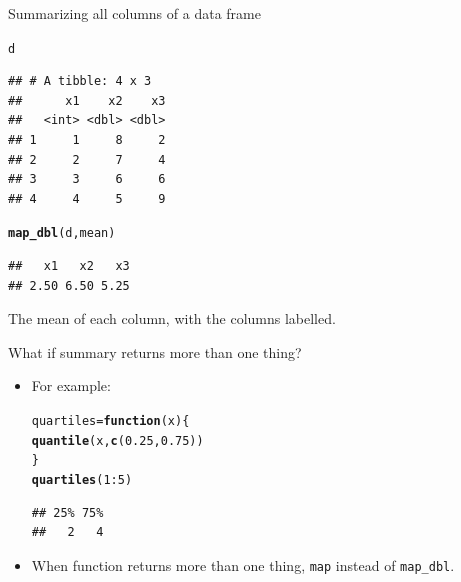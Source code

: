 \documentclass[unknownkeysallowed]{beamer}\usepackage[]{graphicx}\usepackage[]{color}
\makeatletter
\newcommand{\hlnum}[1]{\textcolor[rgb]{0.686,0.059,0.569}{#1}}%
\newcommand{\hlopt}[1]{\textcolor[rgb]{0,0,0}{#1}}%
\newcommand{\hlstd}[1]{\textcolor[rgb]{0.345,0.345,0.345}{#1}}%
\newcommand{\hlkwa}[1]{\textcolor[rgb]{0.161,0.373,0.58}{\textbf{#1}}}%
\newcommand{\hlkwb}[1]{\textcolor[rgb]{0.69,0.353,0.396}{#1}}%
\newcommand{\hlkwc}[1]{\textcolor[rgb]{0.333,0.667,0.333}{#1}}%
\newcommand{\hlkwd}[1]{\textcolor[rgb]{0.737,0.353,0.396}{\textbf{#1}}}%
\newenvironment{kframe}{%
 \def\at@end@of@kframe{}%
 \ifinner\ifhmode%
  \def\at@end@of@kframe{\end{minipage}}%
  \begin{minipage}{\columnwidth}%
 \fi\fi%
 \def\FrameCommand##1{\hskip\@totalleftmargin \hskip-\fboxsep
 \colorbox{shadecolor}{##1}\hskip-\fboxsep
     \hskip-\linewidth \hskip-\@totalleftmargin \hskip\columnwidth}%
 \MakeFramed {\advance\hsize-\width
   \@totalleftmargin\z@ \linewidth\hsize
   \@setminipage}}%
 {\par\unskip\endMakeFramed%
 \at@end@of@kframe}
\newenvironment{knitrout}{}{} %
\makeatother
\begin{document}
\begin{frame}[fragile]{Summarizing all columns of a data frame}
  
\begin{knitrout}
\color{fgcolor}\begin{kframe}
\begin{alltt}
\hlstd{d}
\end{alltt}
\begin{verbatim}
## # A tibble: 4 x 3
##      x1    x2    x3
##   <int> <dbl> <dbl>
## 1     1     8     2
## 2     2     7     4
## 3     3     6     6
## 4     4     5     9
\end{verbatim}
\begin{alltt}
\hlkwd{map_dbl}\hlstd{(d,mean)}
\end{alltt}
\begin{verbatim}
##   x1   x2   x3 
## 2.50 6.50 5.25
\end{verbatim}
\end{kframe}
\end{knitrout}

The mean of each column, with the columns labelled.
  
\end{frame}

\begin{frame}[fragile]{What if summary returns more than one thing?}
  
  \begin{itemize}
  \item For example:
    
\begin{knitrout}
\color{fgcolor}\begin{kframe}
\begin{alltt}
\hlstd{quartiles}\hlkwb{=}\hlkwa{function}\hlstd{(}\hlkwc{x}\hlstd{) \{}
  \hlkwd{quantile}\hlstd{(x,}\hlkwd{c}\hlstd{(}\hlnum{0.25}\hlstd{,}\hlnum{0.75}\hlstd{))}
\hlstd{\}}
\hlkwd{quartiles}\hlstd{(}\hlnum{1}\hlopt{:}\hlnum{5}\hlstd{)}
\end{alltt}
\begin{verbatim}
## 25% 75% 
##   2   4
\end{verbatim}
\end{kframe}
\end{knitrout}

\item When function returns more than one thing, \texttt{map} instead
  of \texttt{map\_dbl}.

  
  
  \end{itemize}
  
\end{frame}
\end{document}
